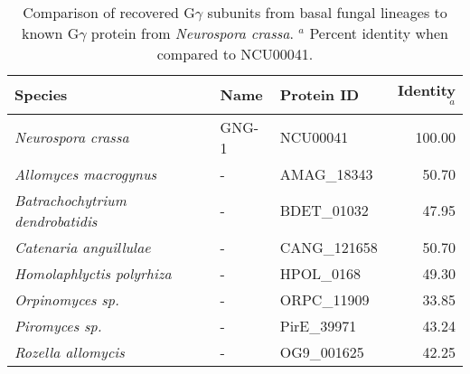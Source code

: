 \begin{table}[hp]
\caption[G$\gamma$ subunit comparison.]{Comparison of recovered G$\gamma$ subunits from basal fungal lineages to known G$\gamma$ protein from \textit{Neurospora crassa}. $^{a}$ Percent identity when compared to NCU00041.} 
\label{tab:ChRhodA_GGcomp}
\begin{tabular}{lllr}
  \hline
Species & Name & Protein ID & Identity$^{a}$ \\ 
  \hline
\emph{Neurospora crassa} & GNG-1 & NCU00041 & 100.00 \\ 
  \emph{Allomyces macrogynus} & - & AMAG\_18343 & 50.70 \\ 
  \emph{Batrachochytrium dendrobatidis} & - & BDET\_01032 & 47.95 \\ 
  \emph{Catenaria anguillulae} & - & CANG\_121658 & 50.70 \\ 
  \emph{Homolaphlyctis polyrhiza} & - & HPOL\_0168 & 49.30 \\ 
  \emph{Orpinomyces sp.} & - & ORPC\_11909 & 33.85 \\ 
  \emph{Piromyces sp.} & - & PirE\_39971 & 43.24 \\ 
  \emph{Rozella allomycis} & - & OG9\_001625 & 42.25 \\ 
   \hline
\end{tabular}
\end{table}
